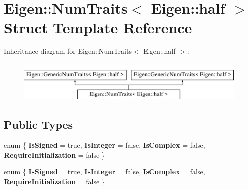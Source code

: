 \hypertarget{struct_eigen_1_1_num_traits_3_01_eigen_1_1half_01_4}{}\section{Eigen\+:\+:Num\+Traits$<$ Eigen\+:\+:half $>$ Struct Template Reference}
\label{struct_eigen_1_1_num_traits_3_01_eigen_1_1half_01_4}
Inheritance diagram for Eigen\+:\+:Num\+Traits$<$ Eigen\+:\+:half $>$\+:\begin{figure}[H]
\begin{center}
\leavevmode
\includegraphics[height=2.000000cm]{struct_eigen_1_1_num_traits_3_01_eigen_1_1half_01_4}
\end{center}
\end{figure}
\subsection*{Public Types}
\begin{DoxyCompactItemize}
\item 
\mbox{\label{struct_eigen_1_1_num_traits_3_01_eigen_1_1half_01_4_a2ea5719a8b3e98836f0190151fd75a1d}} 
enum \{ {\bfseries Is\+Signed} = true, 
{\bfseries Is\+Integer} = false, 
{\bfseries Is\+Complex} = false, 
{\bfseries Require\+Initialization} = false
 \}
\item 
\mbox{\label{struct_eigen_1_1_num_traits_3_01_eigen_1_1half_01_4_a72412b9df02e3df280d50cf66acba2ce}} 
enum \{ {\bfseries Is\+Signed} = true, 
{\bfseries Is\+Integer} = false, 
{\bfseries Is\+Complex} = false, 
{\bfseries Require\+Initialization} = false
 \}
\end{DoxyCompactItemize}
